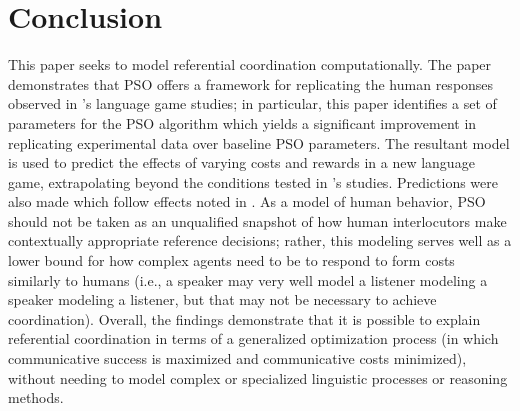 \documentclass[a4paper,11pt]{article}
\begin{document}
\section{Conclusion}
This paper seeks to model referential coordination computationally. The paper demonstrates that PSO offers a framework for replicating the human responses observed in \citeauthor{rohde2012}'s \citeyear{rohde2012} language game studies; in particular, this paper identifies a set of parameters for the PSO algorithm which yields a significant improvement in replicating experimental data over baseline PSO parameters. The resultant model is used to predict the effects of varying costs and rewards in a new language game, extrapolating beyond the conditions tested in \citeauthor{rohde2012}'s studies. Predictions were also made which follow effects noted in \citeauthor{brennan1996}. As a model of human behavior, PSO should not be taken as an unqualified snapshot of how human interlocutors make contextually appropriate reference decisions; rather, this modeling serves well as a lower bound for how complex agents need to be to respond to form costs similarly to humans (i.e., a speaker may very well model a listener modeling a speaker modeling a listener, but that may not be necessary to achieve coordination). Overall, the findings demonstrate that it is possible to explain referential coordination in terms of a generalized optimization process (in which communicative success is maximized and communicative costs minimized), without needing to model complex or specialized linguistic processes or reasoning methods.







\end{document}
